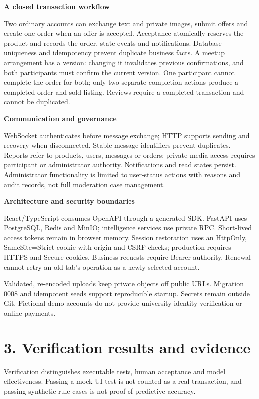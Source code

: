 \documentclass[12pt,a4paper]{article}
\newcommand{\heading}[1]{\vspace{6pt}\textbf{#1}\par}
\begin{document}
\heading{A closed transaction workflow}
Two ordinary accounts can exchange text and private images, submit offers and create one order when an offer is accepted. Acceptance atomically reserves the product and records the order, state events and notifications. Database uniqueness and idempotency prevent duplicate business facts. A meetup arrangement has a version: changing it invalidates previous confirmations, and both participants must confirm the current version. One participant cannot complete the order for both; only two separate completion actions produce a completed order and sold listing. Reviews require a completed transaction and cannot be duplicated.

\heading{Communication and governance}
WebSocket authenticates before message exchange; HTTP supports sending and recovery when disconnected. Stable message identifiers prevent duplicates. Reports refer to products, users, messages or orders; private-media access requires participant or administrator authority. Notifications and read states persist. Administrator functionality is limited to user-status actions with reasons and audit records, not full moderation case management.

\heading{Architecture and security boundaries}
React/TypeScript consumes OpenAPI through a generated SDK. FastAPI uses PostgreSQL, Redis and MinIO; intelligence services use private RPC. Short-lived access tokens remain in browser memory. Session restoration uses an HttpOnly, SameSite=Strict cookie with origin and CSRF checks; production requires HTTPS and Secure cookies. Business requests require Bearer authority. Renewal cannot retry an old tab's operation as a newly selected account.

Validated, re-encoded uploads keep private objects off public URLs. Migration 0008 and idempotent seeds support reproducible startup. Secrets remain outside Git. Fictional demo accounts do not provide university identity verification or online payments.

\clearpage
\section*{3. Verification results and evidence}
Verification distinguishes executable tests, human acceptance and model effectiveness. Passing a mock UI test is not counted as a real transaction, and passing synthetic rule cases is not proof of predictive accuracy.
\end{document}
